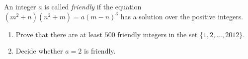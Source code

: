 An integer $a$ is called \emph{friendly} if the equation $(m^{2} + n)(n^{2} + m) = a(m - n)^{3}$ has a solution over the positive integers.

\begin{enumerate}
\item[a)] Prove that there are at least $500$ friendly integers in the set $\{1, 2, \ldots, 2012\}$.
\item[b)] Decide whether $a = 2$ is friendly.
\end{enumerate}
